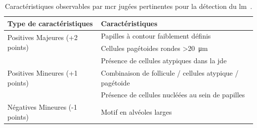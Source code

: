 \begin{table}[H]
\centering
    \begin{tabular}{ll}
        \toprule
        Type de caractéristiques                        & Caractéristiques                                              \\\hline
        \multirow{2}{*}{Positives Majeures (+2 points)} & Papilles à contour faiblement définis                         \\\cline{2-2}
                                                        & Cellules pagétoides rondes >\SI{20}{\micro\metre}             \\\midrule
        \multirow{3}{*}{Positives Mineures (+1 points)} & Présence de cellules atypiques dans la \gls{jde}              \\\cline{2-2}
                                                        & Combinaison de follicule / cellules atypique / pagétoide      \\\cline{2-2}
                                                        & Présence de cellules nucléées au sein de papilles             \\\midrule
        Négatives Mineures (-1 points)                  & Motif en alvéoles larges                                      \\\bottomrule
    \end{tabular}
    \caption{Caractéristiques observables par \gls{mcr} jugées pertinentes pour la détection du \gls{lm}~\cite{Guitera2010}.}
    \label{tab:rcm_algorithm_lentigo}
\end{table}\par
 
